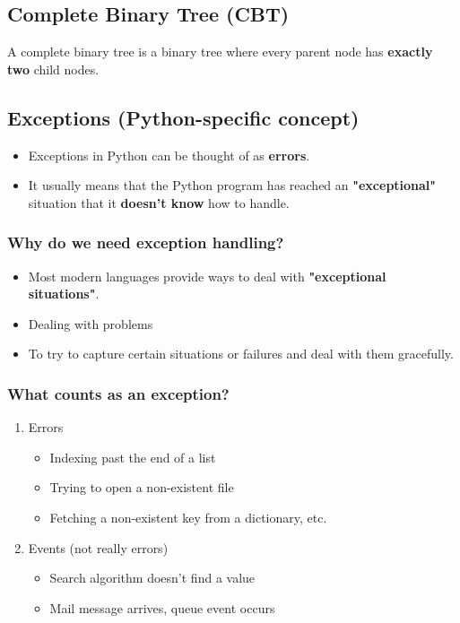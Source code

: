 \documentclass[11pt]{article}
\begin{document}
\subsection{Complete Binary Tree (CBT)}
\label{sec:org8e1b7b1}
A complete binary tree is a binary tree where every parent node has \textbf{exactly two} child nodes.

\subsection{Exceptions (Python-specific concept)}
\label{sec:org060bf93}
\begin{itemize}
\item Exceptions in Python can be thought of as \textbf{errors}.
\item It usually means that the Python program has reached an \textbf{"exceptional"} situation that it \textbf{doesn't know} how to handle.
\end{itemize}

\subsubsection{Why do we need exception handling?}
\label{sec:orgff97819}
\begin{itemize}
\item Most modern languages provide ways to deal with \textbf{"exceptional situations"}.
\item Dealing with problems
\item To try to capture certain situations or failures and deal with them gracefully.
\end{itemize}

\subsubsection{What counts as an exception?}
\label{sec:org6b0aaaf}
\begin{enumerate}
\item Errors
\begin{itemize}
\item Indexing past the end of a list
\item Trying to open a non-existent file
\item Fetching a non-existent key from a dictionary, etc.
\end{itemize}

\item Events (not really errors)
\begin{itemize}
\item Search algorithm doesn't find a value
\item Mail message arrives, queue event occurs
\end{itemize}
\end{enumerate}
\end{document}
